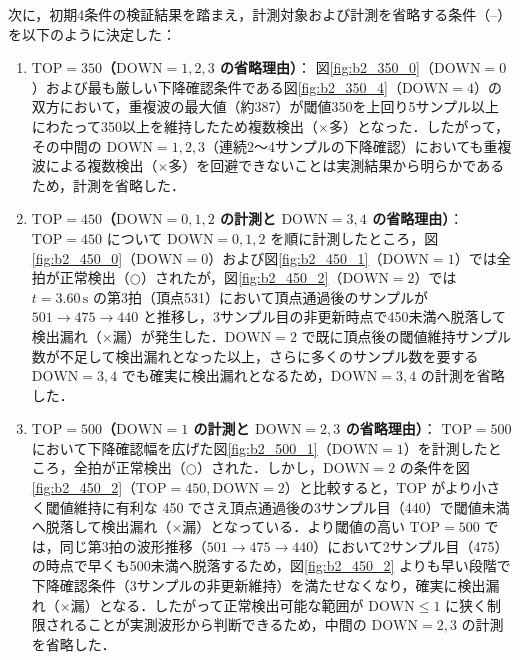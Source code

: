 次に，初期4条件の検証結果を踏まえ，計測対象および計測を省略する条件（--）を以下のように決定した：
\begin{enumerate}
  \item \textbf{$\mathrm{TOP} = 350$（$\mathrm{DOWN} = 1, 2, 3$ の省略理由）}：
        図\ref{fig:b2_350_0}（$\mathrm{DOWN} = 0$）および最も厳しい下降確認条件である図\ref{fig:b2_350_4}（$\mathrm{DOWN} = 4$）の双方において，重複波の最大値（約387）が閾値350を上回り5サンプル以上にわたって350以上を維持したため複数検出（$\times$多）となった．したがって，その中間の $\mathrm{DOWN} = 1, 2, 3$（連続2〜4サンプルの下降確認）においても重複波による複数検出（$\times$多）を回避できないことは実測結果から明らかであるため，計測を省略した．
  \item \textbf{$\mathrm{TOP} = 450$（$\mathrm{DOWN} = 0, 1, 2$ の計測と $\mathrm{DOWN} = 3, 4$ の省略理由）}：
        $\mathrm{TOP} = 450$ について $\mathrm{DOWN} = 0, 1, 2$ を順に計測したところ，図\ref{fig:b2_450_0}（$\mathrm{DOWN} = 0$）および図\ref{fig:b2_450_1}（$\mathrm{DOWN} = 1$）では全拍が正常検出（$\bigcirc$）されたが，図\ref{fig:b2_450_2}（$\mathrm{DOWN} = 2$）では $t = 3.60\,\mathrm{s}$ の第3拍（頂点531）において頂点通過後のサンプルが $501 \to 475 \to 440$ と推移し，3サンプル目の非更新時点で450未満へ脱落して検出漏れ（$\times$漏）が発生した．$\mathrm{DOWN} = 2$ で既に頂点後の閾値維持サンプル数が不足して検出漏れとなった以上，さらに多くのサンプル数を要する $\mathrm{DOWN} = 3, 4$ でも確実に検出漏れとなるため，$\mathrm{DOWN} = 3, 4$ の計測を省略した．
  \item \textbf{$\mathrm{TOP} = 500$（$\mathrm{DOWN} = 1$ の計測と $\mathrm{DOWN} = 2, 3$ の省略理由）}：
        $\mathrm{TOP} = 500$ において下降確認幅を広げた図\ref{fig:b2_500_1}（$\mathrm{DOWN} = 1$）を計測したところ，全拍が正常検出（$\bigcirc$）された．しかし，$\mathrm{DOWN} = 2$ の条件を図\ref{fig:b2_450_2}（$\mathrm{TOP} = 450, \mathrm{DOWN} = 2$）と比較すると，$\mathrm{TOP}$ がより小さく閾値維持に有利な 450 でさえ頂点通過後の3サンプル目（440）で閾値未満へ脱落して検出漏れ（$\times$漏）となっている．より閾値の高い $\mathrm{TOP} = 500$ では，同じ第3拍の波形推移（$501 \to 475 \to 440$）において2サンプル目（475）の時点で早くも500未満へ脱落するため，図\ref{fig:b2_450_2} よりも早い段階で下降確認条件（3サンプルの非更新維持）を満たせなくなり，確実に検出漏れ（$\times$漏）となる．したがって正常検出可能な範囲が $\mathrm{DOWN} \le 1$ に狭く制限されることが実測波形から判断できるため，中間の $\mathrm{DOWN} = 2, 3$ の計測を省略した．
\end{enumerate}

